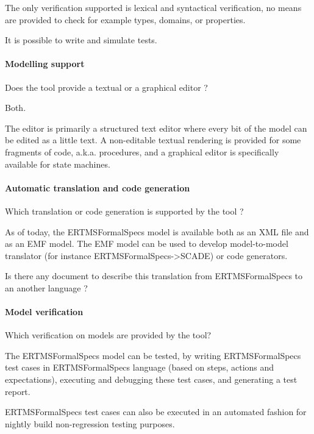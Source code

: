 \begin{assessor2}
The only verification supported is lexical and syntactical verification, no means are provided to check for example types, domains, or properties.

It is possible to write and simulate tests.
\end{assessor2}


\paragraph{Modelling support}
Does the tool provide a  textual or a graphical editor ?

\begin{author_comment}
Both.
\end{author_comment}

\begin{assessor1}
The editor is primarily a structured text editor where every bit of the model can be edited as a little text. 
A non-editable textual rendering is provided for some fragments of code, a.k.a. procedures, and a graphical editor is specifically available for state machines. 
\end{assessor1}

\paragraph{Automatic translation and code generation}
Which translation or code generation is supported by the tool ?

\begin{author_comment}
As of today, the ERTMSFormalSpecs model is available both as an XML file and as an EMF model. The EMF model can be used to develop model-to-model translator (for instance ERTMSFormalSpecs->SCADE) or code generators.
\end{author_comment}


\begin{assessor2}
Is there any document to describe this translation from ERTMSFormalSpecs to an another language ?
\end{assessor2}



\paragraph{Model verification}
Which verification on models are provided by the tool?

\begin{author_comment}
The ERTMSFormalSpecs model can be tested, by writing ERTMSFormalSpecs test cases in ERTMSFormalSpecs language (based on steps, actions and expectations), executing and debugging these test cases, and generating a test report. 

ERTMSFormalSpecs test cases can also be executed in an automated fashion for nightly build non-regression testing purposes.
\end{author_comment}



